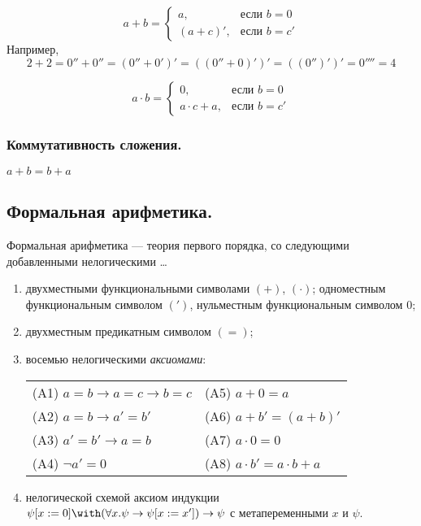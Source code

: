 \documentclass[10pt,a4paper,oneside]{article}
\begin{document}
\vspace{-0.3cm}
$$a + b = \left\{ \begin{array}{ll} a, & \mbox{если } b = 0\\
                                    (a + c)', & \mbox{если } b = c'
                  \end{array}\right.$$
\vspace{-0.3cm}
Например, $$2 + 2 = 0'' + 0'' = (0'' + 0')' = ((0'' + 0)')' = ((0'')')' = 0'''' = 4$$\vspace{-0.3cm}

\vspace{-0.3cm}
$$a \cdot b = \left\{ \begin{array}{ll} 0, & \mbox{если } b = 0\\
                                    a \cdot c + a, & \mbox{если } b = c'
                  \end{array}\right.$$
                  
\subsubsection{Коммутативность сложения.}
$a + b = b + a$

\subsection{Формальная арифметика.}
Формальная арифметика --- теория первого порядка, со следующими добавленными нелогическими \dots
\begin{enumerate}
\item двухместными функциональными символами $(+)$, $(\cdot)$; одноместным функциональным символом $(')$, 
нульместным функциональным символом $0$;
\item двухместным предикатным символом $(=)$;
\item восемью нелогическими \emph{аксиомами}:\vspace{0.1cm}
\begin{tabular}{ll}
(A1) $a=b \to a=c \to b=c$             &(A5) $a+0 = a$                     \\
(A2) $a=b \to a'=b'$                   &(A6) $a+b' = (a+b)'$               \\
(A3) $a'=b' \to a=b$                   &(A7) $a\cdot 0 = 0$                \\
(A4) $\neg a' = 0$                     &(A8) $a\cdot b' = a \cdot b + a$
\end{tabular}
\item нелогической схемой аксиом индукции $\psi[x:=0]\with(\forall x.\psi\to \psi[x:=x'])\to \psi$ с метапеременными $x$ и $\psi$.
\end{enumerate}
\end{document}
